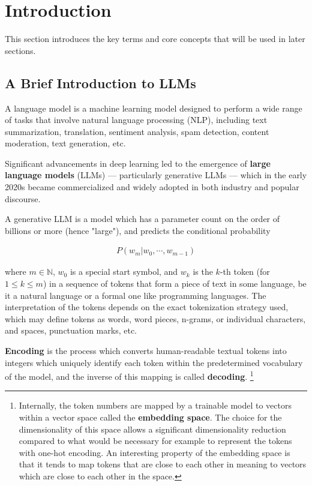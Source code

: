 \documentclass[noindent,nohyp,parspace,titlepage,twoside,12pt]{article}
\begin{document}
  \section{Introduction}

    This section introduces the key terms and core concepts that will be used
    in later sections.

    \subsection{A Brief Introduction to LLMs}

      A language model is a machine learning model designed to perform a wide
      range of tasks that involve natural language processing (NLP), including
      text summarization, translation, sentiment analysis, spam detection,
      content moderation, text generation, etc.

      Significant advancements in deep learning \cite{attention,gpt3,gpt4} led
      to the emergence of \textbf{large language models} (LLMs) --- particularly
      generative LLMs --- which in the early 2020s became commercialized and
      widely adopted in both industry and popular discourse.

      A generative LLM is a model which has a parameter count on the order of
      billions or more (hence "large"), and predicts the conditional
      probability \cite{llms}

      \begin{align} \label{eqautoreg}
        P(w_m | w_0, \cdots, w_{m-1})
      \end{align}

      where $m \in \mathbb{N}$, $w_0$ is a special start symbol, and $w_k$ is
      the $k$-th token (for $1 \le k \le m$) in a sequence of tokens that form
      a piece of text in some language, be it a natural language or a formal
      one like programming languages. The interpretation of the tokens depends
      on the exact tokenization strategy used, which may define tokens as
      words, word pieces, n-grams, or individual characters, and spaces,
      punctuation marks, etc.

      \textbf{Encoding} is the process which converts human-readable textual
      tokens into integers which uniquely identify each token within the
      predetermined vocabulary of the model, and the inverse of this mapping
      is called \textbf{decoding}. \footnote{Internally, the token numbers are
      mapped by a trainable model to vectors within a vector space called the
      \textbf{embedding space}. The choice for the dimensionality of this space
      allows a significant dimensionality reduction compared to what would be
      necessary for example to represent the tokens with one-hot encoding. An
      interesting property of the embedding space is that it tends to map
      tokens that are close to each other in meaning to vectors which are close
      to each other in the space.}
\end{document}
